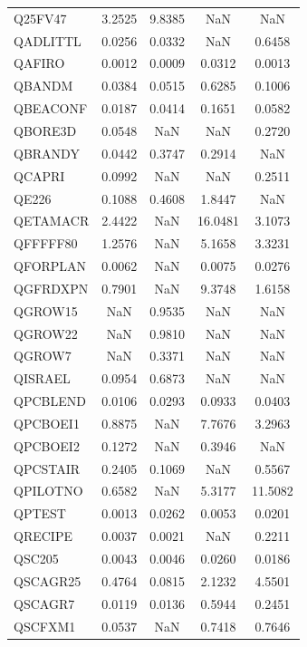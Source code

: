 \begin{longtable}{lcccc}
Q25FV47  &   3.2525 &   9.8385 &      NaN &      NaN \\
QADLITTL &   0.0256 &   0.0332 &      NaN &   0.6458 \\
QAFIRO   &   0.0012 &   0.0009 &   0.0312 &   0.0013 \\
QBANDM   &   0.0384 &   0.0515 &   0.6285 &   0.1006 \\
QBEACONF &   0.0187 &   0.0414 &   0.1651 &   0.0582 \\
QBORE3D  &   0.0548 &      NaN &      NaN &   0.2720 \\
QBRANDY  &   0.0442 &   0.3747 &   0.2914 &      NaN \\
QCAPRI   &   0.0992 &      NaN &      NaN &   0.2511 \\
QE226    &   0.1088 &   0.4608 &   1.8447 &      NaN \\
QETAMACR &   2.4422 &      NaN &  16.0481 &   3.1073 \\
QFFFFF80 &   1.2576 &      NaN &   5.1658 &   3.3231 \\
QFORPLAN &   0.0062 &      NaN &   0.0075 &   0.0276 \\
QGFRDXPN &   0.7901 &      NaN &   9.3748 &   1.6158 \\
QGROW15  &      NaN &   0.9535 &      NaN &      NaN \\
QGROW22  &      NaN &   0.9810 &      NaN &      NaN \\
QGROW7   &      NaN &   0.3371 &      NaN &      NaN \\
QISRAEL  &   0.0954 &   0.6873 &      NaN &      NaN \\
QPCBLEND &   0.0106 &   0.0293 &   0.0933 &   0.0403 \\
QPCBOEI1 &   0.8875 &      NaN &   7.7676 &   3.2963 \\
QPCBOEI2 &   0.1272 &      NaN &   0.3946 &      NaN \\
QPCSTAIR &   0.2405 &   0.1069 &      NaN &   0.5567 \\
QPILOTNO &   0.6582 &      NaN &   5.3177 &  11.5082 \\
QPTEST   &   0.0013 &   0.0262 &   0.0053 &   0.0201 \\
QRECIPE  &   0.0037 &   0.0021 &      NaN &   0.2211 \\
QSC205   &   0.0043 &   0.0046 &   0.0260 &   0.0186 \\
QSCAGR25 &   0.4764 &   0.0815 &   2.1232 &   4.5501 \\
QSCAGR7  &   0.0119 &   0.0136 &   0.5944 &   0.2451 \\
QSCFXM1  &   0.0537 &      NaN &   0.7418 &   0.7646 \\

\end{longtable}
